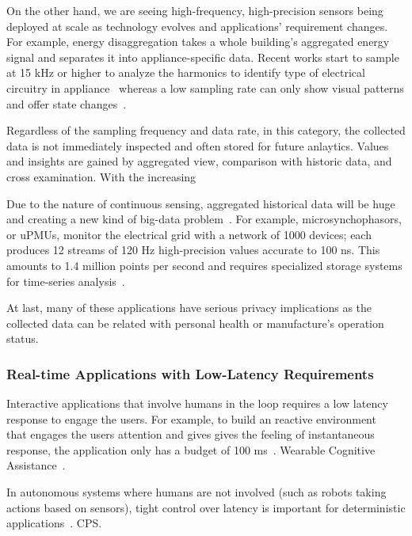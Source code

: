 On the other hand, we are seeing high-frequency, high-precision sensors being
deployed at scale as technology evolves and applications' requirement
changes. For example, energy disaggregation takes a whole building's aggregated
energy signal and separates it into appliance-specific data. Recent works start
to sample at 15 kHz or higher to analyze the harmonics to identify type of
electrical circuitry in appliance~\cite{kolter2011redd} whereas a low sampling
rate can only show visual patterns and offer state
changes~\cite{hart1992nonintrusive}.

Regardless of the sampling frequency and data rate, in this category, the
collected data is not immediately inspected and often stored for future
anlaytics. Values and insights are gained by aggregated view, comparison with
historic data, and cross examination. With the increasing

Due to the nature of continuous sensing, aggregated historical data will be huge
and creating a new kind of big-data problem~\cite{diaz2012big,
  zaslavsky2013sensing}. For example, microsynchophasors, or uPMUs, monitor the
electrical grid with a network of 1000 devices; each produces 12 streams of 120
Hz high-precision values accurate to 100 ns. This amounts to 1.4 million points
per second and requires specialized storage systems for time-series
analysis~\cite{andersen2016btrdb}.

At last, many of these applications have serious privacy implications as the
collected data can be related with personal health or manufacture's operation
status.

\subsubsection{Real-time Applications with Low-Latency Requirements}
\label{sec:inter-low-latency}

Interactive applications that involve humans in the loop requires a low latency
response to engage the users. For example, to build an reactive
environment~\cite{cooperstock1997reactive} that engages the users attention and
gives gives the feeling of instantaneous response, the application only has a
budget of 100 ms~\cite{nielsen1994usability}. Wearable Cognitive
Assistance~\cite{chen2018application}.

In autonomous systems where humans are not involved (such as robots taking
actions based on sensors), tight control over latency is important for
deterministic applications~\cite{eidson2012distributed}. CPS.

